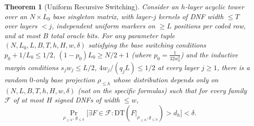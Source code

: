 \documentclass[11pt,a4paper]{article}
\newtheorem{theorem}{Theorem}[section]
\theoremstyle{definition}
\theoremstyle{remark}
\newcommand{\DT}{\mathrm{DT}}
\newcommand{\Prb}{\Pr}
\begin{document}
\begin{theorem}[Uniform Recursive Switching]
\label{thm:recursive-switching}
Consider an $h$-layer acyclic tower over an $N \times L_0$ base singleton matrix, with layer-$j$ kernels of DNF width $\le T$ over layers $< j$, independent uniform markers on $\ge L$ positions per coded row, and at most $B$ total oracle bits. For any parameter tuple $(N, L_0, L, B, T, h, H, w, \delta)$ satisfying the base switching conditions $p_0 + 1/L_0 \le 1/2$, $(1-p_0)L_0 \ge N/2 + 1$ (where $p_0 = \frac{1}{32 w_0^2}$) and the inductive margin conditions $s_j w_j \le L/2$, $4w_j/(q_j L) \le 1/2$ at every layer $j \ge 1$, there is a random $0$-only base projection $\rho_{\le h}$ whose distribution depends \emph{only} on $(N, L, B, T, h, H, w, \delta)$ (not on the specific formulas) such that for every family $\mathcal{F}$ of at most $H$ signed DNFs of width $\le w$,
\[
  \Prb_{\rho_{\le h},\, g_{\le h}}\bigl[\exists F \in \mathcal{F} : \DT(F|_{\rho_{\le h}, g_{\le h}}) > d_h\bigr] < \delta.
\]
\end{theorem}
\end{document}
